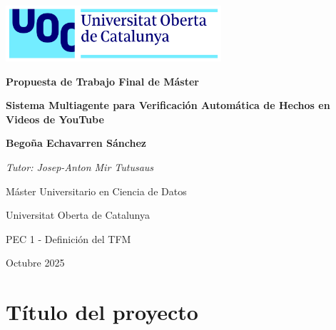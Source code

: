 \documentclass[12pt,a4paper]{article}
\begin{document}
\begin{titlepage}
    \begin{center}
    \vspace*{0.5cm}

    \includegraphics[width=0.6\textwidth]{../../assets/uoc_logo.png}

    \vspace{1.5cm}

    {\Huge \textbf{Propuesta de Trabajo Final de Máster}}

    \vspace{2cm}

    {\LARGE \textbf{Sistema Multiagente para Verificación Automática de Hechos en Videos de YouTube}}

    \vspace{2.5cm}

    \textbf{\large Begoña Echavarren Sánchez}

    \vspace{0.5cm}

    \textit{Tutor: Josep-Anton Mir Tutusaus}

    \vspace{2cm}

    {\large Máster Universitario en Ciencia de Datos}

    {\large Universitat Oberta de Catalunya}

    \vspace{1cm}

    {\large PEC 1 - Definición del TFM}

    \vspace{0.5cm}

    {\large Octubre 2025}

    \end{center}
\end{titlepage}

\newpage
{}

\hypersetup{linkcolor=black}
\tableofcontents
\hypersetup{linkcolor=blue}

\newpage

\section{Título del proyecto}
\end{document}
